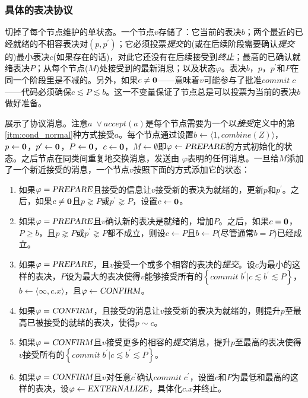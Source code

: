 \subsubsection{具体的表决协议}\label{sec:scp_nominate_concrete}

切掉了每个节点维护的单{\slot}状态。一个节点$v$存储了：它当前的表决$b$；两个最近的已经就绪的不相容表决对$(p,p^{\prime})$；它必须投票\textit{提交}的(或在后续阶段需要确认\textit{提交}的)最小表决$c$(如果存在的话)，对此它还没有在后续接受到\textit{终止}；最高的已确认就绪表决$P$；从每个节点($M$)处接受到的最新消息；以及状态$\varphi$。表决$b$，$p$，$p^{\prime}$和$P$在同一个阶段里是不减的。另外，如果$c\neq{\bm 0}$——意味着$v$可能参与了批准$commit\;c$——代码必须确保$c\lesssim P\lesssim b$。这一不变量保证了节点总是可以投票为当前的表决$b$做好准备。

展示了协议消息。注意$a\;\vee accept(a)$是每个节点需要为一个{\quorum}以\textit{接受}定义中的第\ref{itm:cond_normal}种方式接受$a$。每个节点通过设置$b\leftarrow \langle 1,combine(Z)\rangle$，$p\leftarrow {\bm 0}$，$p^{\prime}\leftarrow {\bm 0}$，$P\leftarrow {\bm 0}$，$c\leftarrow {\bm 0}$，$M\leftarrow\emptyset$即$\varphi \leftarrow \textsl{PREPARE}$的方式初始化{\slot}的状态。之后节点在同类间重复地交换消息，发送由 $\varphi$表明的任何消息。一旦给$M$添加了一个新近接受的消息，一个节点$v$按照下面的方式添加它的状态：

\begin{enumerate}\label{protocal_case}
	\item 如果$\varphi = \textsl{PREPARE}$且接受的信息让$v$接受新的表决为就绪的，更新$p$和$p^{\prime}$。之后，如果$c\neq {\bm 0}$且$p\gnsim P$或$p^{\prime}\gnsim P$，设置$c\leftarrow {\bm 0}$。
	\item 如果$\varphi = \textsl{PREPARE}$且$v$确认新的表决是就绪的，增加$P$。之后，如果$c={\bm 0}$，$P\geq b$，且$p\gnsim P$或$p^{\prime}\gnsim P$都不成立，则设$c\leftarrow P$且$b\leftarrow P$(尽管通常$b=P$)已经成立。
	\item 如果$\varphi = \textsl{PREPARE}$，且$v$接受一个或多个相容的表决的\textit{提交}。设$c$为最小的这样的表决，$P$设为最大的表决使得$v$能够接受所有的$\left\{commit\;b^{\prime}|c\lesssim b^{\prime}\lesssim P\right\}$，$b\leftarrow \langle \infty, c.x\rangle$，且$\varphi\leftarrow \textsl{CONFIRM}$。
	\item 如果$\varphi = \textsl{CONFIRM}$，且接受的消息让$v$接受新的表决为就绪的，则提升$p$至最高已被接受的就绪的表决，使得$p\sim c$。
	\item 如果$\varphi = \textsl{CONFIRM}$且$v$接受更多的相容的\textit{提交}消息，提升$p$至最高的表决使得$v$接受所有的$\left\{commit\;b^{\prime}|c\lesssim b^{\prime} \lesssim P\right\}$。
	\item 如果$\varphi = \textsl{CONFIRM}$且$v$对任意$c^{\prime}$确认$commit\;c^{\prime}$，设置$c$和$P$为最低和最高的这样的表决，设$\varphi\leftarrow\textsl{EXTERNALIZE}$，具体化$c.x$并终止。
\end{enumerate}

